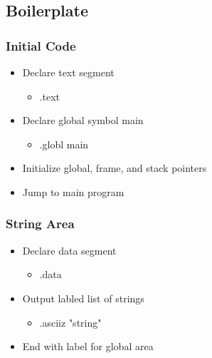 \documentclass[usepdftitle=false,professionalfonts,compress ]{beamer}
\begin{document}
\subsection{Boilerplate}

{
\begin{frame}\frametitle{Initial Code}

	\begin{itemize}
	\item Declare text segment

	\begin{itemize}
	\item .text
				\end{itemize}

			\item Declare global symbol main

	\begin{itemize}
	\item .globl main
				\end{itemize}

			\item Initialize global, frame, and stack pointers
			\item Jump to main program
				\end{itemize}

\end{frame}}






{
\begin{frame}\frametitle{String Area}

	\begin{itemize}
	\item Declare data segment

	\begin{itemize}
	\item .data
				\end{itemize}

			\item Output labled list of strings

	\begin{itemize}
	\item .asciiz "string"
				\end{itemize}

			\item End with label for global area
				\end{itemize}

\end{frame}}
\end{document}
